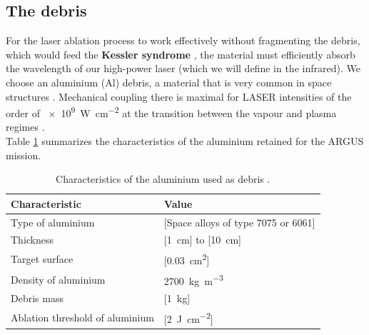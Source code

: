 \documentclass[11pt,a4paper]{article}
\begin{document}
\subsection{The debris}
For the laser ablation process to work effectively without fragmenting the debris, which would feed the \textbf{Kessler syndrome} \cite{Kessler1978}, the material must efficiently absorb the wavelength of our high-power laser (which we will define in the infrared). We choose an aluminium (Al) debris, a material that is very common in space structures \cite{Graham2001}. Mechanical coupling there is maximal for LASER intensities of the order of \SI{e9}{\watt\per\centi\metre\squared} at the transition between the vapour and plasma regimes \cite{Jin2013}. \\
Table \ref{tab:debris_al} summarizes the characteristics of the aluminium retained for the ARGUS mission.
\Needspace{7cm}
\begin{table}[H]
  \centering
  \caption{Characteristics of the aluminium used as debris \cite{Phipps2012}.} 
  \label{tab:debris_al}
  \begin{tabular}{p{6cm} p{6cm}}
    \toprule
    \textbf{Characteristic} & \textbf{Value} \\
    \midrule
    Type of aluminium & [Space alloys of type 7075 or 6061] \\
    Thickness & [\SI{1}{\centi\metre}] to [\SI{10}{\centi\metre}] \\
    Target surface & [\SI{0.03}{\centi\metre\squared}] \\
    Density of aluminium & \SI{2700}{\kilo\gram\per\metre\cubed} \\
    Debris mass & [\SI{1}{\kilo\gram}] \\
    Ablation threshold of aluminium & [\SI{2}{\joule\per\centi\metre\squared}] \\
    \bottomrule
  \end{tabular}
\end{table}


\end{document}
